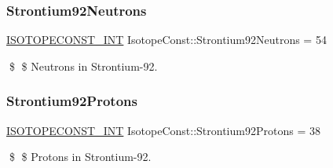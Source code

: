 \subsubsection{\texorpdfstring{Strontium92\+Neutrons}{Strontium92Neutrons}}
{\footnotesize\ttfamily \mbox{\hyperlink{group___isotope_const-_macros_ga5f18360b3e99483a35c32d789e62621c}{I\+S\+O\+T\+O\+P\+E\+C\+O\+N\+S\+T\+\_\+\+I\+NT}} Isotope\+Const\+::\+Strontium92\+Neutrons = 54}

\$ \$ Neutrons in Strontium-\/92. \mbox{\label{group___isotope_const-_strontium-_sr92_gae094fec1cdf0a64b0b734da75d2ff516}} 
\subsubsection{\texorpdfstring{Strontium92\+Protons}{Strontium92Protons}}
{\footnotesize\ttfamily \mbox{\hyperlink{group___isotope_const-_macros_ga5f18360b3e99483a35c32d789e62621c}{I\+S\+O\+T\+O\+P\+E\+C\+O\+N\+S\+T\+\_\+\+I\+NT}} Isotope\+Const\+::\+Strontium92\+Protons = 38}

\$ \$ Protons in Strontium-\/92. 